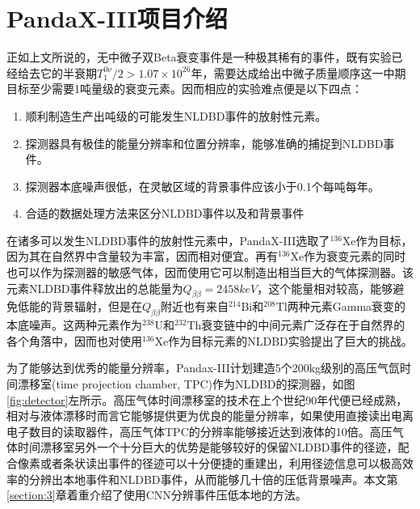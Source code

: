 
\chapter{PandaX-III项目介绍}
\label{chapter:1}

正如上文所说的，无中微子双Beta衰变事件是一种极其稀有的事件，既有实验已经给去它的半衰期$T^{0\nu}_1/2>1.07\times10^{26}$年，需要达成给出中微子质量顺序这一中期目标至少需要1吨量级的衰变元素。因而相应的实验难点便是以下四点：

\begin{enumerate}
    \item 顺利制造生产出吨级的可能发生NLDBD事件的放射性元素。
    \item 探测器具有极佳的能量分辨率和位置分辨率，能够准确的捕捉到NLDBD事件。
    \item 探测器本底噪声很低，在灵敏区域的背景事件应该小于0.1个每吨每年。
    \item 合适的数据处理方法来区分NLDBD事件以及和背景事件
\end{enumerate}

在诸多可以发生NLDBD事件的放射性元素中，PandaX-III选取了$^{136}$Xe作为目标，因为其在自然界中含量较为丰富，因而相对便宜。再有$^{136}$Xe作为衰变元素的同时也可以作为探测器的敏感气体，因而使用它可以制造出相当巨大的气体探测器。该元素NLDBD事件释放出的总能量为$Q_{\beta\beta}=2458keV$，这个能量相对较高，能够避免低能的背景辐射，但是在$Q_{\beta\beta}$附近也有来自$^{214}$Bi和$^{208}$Tl两种元素Gamma衰变的本底噪声。这两种元素作为$^{238}$U和$^{232}$Th衰变链中的中间元素广泛存在于自然界的各个角落中，因而也对使用$^{136}$Xe作为目标元素的NLDBD实验提出了巨大的挑战。

为了能够达到优秀的能量分辨率，Pandax-III计划建造5个200kg级别的高压气氙时间漂移室(time projection chamber, TPC)作为NLDBD的探测器，如图\ref{fig:detector}左所示。高压气体时间漂移室的技术在上个世纪90年代便已经成熟，相对与液体漂移时而言它能够提供更为优良的能量分辨率，如果使用直接读出电离电子数目的读取器件，高压气体TPC的分辨率能够接近达到液体的10倍。高压气体时间漂移室另外一个十分巨大的优势是能够较好的保留NLDBD事件的径迹，配合像素或者条状读出事件的径迹可以十分便捷的重建出，利用径迹信息可以极高效率的分辨出本地事件和NLDBD事件，从而能够几十倍的压低背景噪声。本文第\ref{section:3}章着重介绍了使用CNN分辨事件压低本地的方法。

